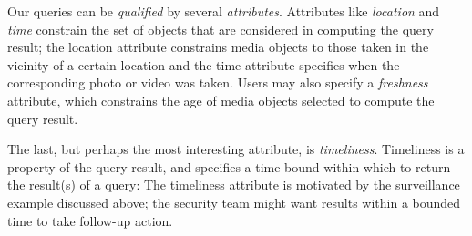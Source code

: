 Our queries can be \emph{qualified} by several \emph{attributes}.
%
Attributes like \emph{location} and \emph{time} constrain the set of
objects that are considered in computing the query result; the
location attribute constrains media objects to those taken in the
vicinity of a certain location and the time attribute specifies when
the corresponding photo or video was taken.
%
Users may also specify a \emph{freshness} attribute, which constrains
the age of media objects selected to compute the query result.

The last, but perhaps the most interesting attribute, is
\emph{timeliness}.
%
Timeliness is a property of the query result, and specifies a time
bound within which to return the result(s) of a query: 
%
The timeliness attribute is motivated by the surveillance example
discussed above; the security team might want results within a bounded
time to take follow-up action.
%

%
%
%
%

